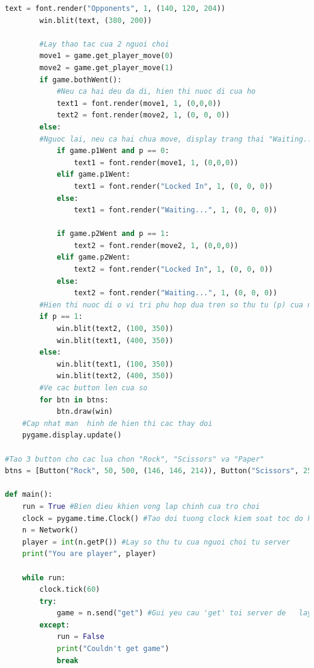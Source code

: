 \documentclass[a4paper]{article}
\begin{document}
\begin{mdframed}[hidealllines=true,backgroundcolor=magenta!10]
\begin{lstlisting}[language=Python]
        text = font.render("Opponents", 1, (140, 120, 204))
        win.blit(text, (380, 200))

        #Lay thao tac cua 2 nguoi choi
        move1 = game.get_player_move(0)
        move2 = game.get_player_move(1)
        if game.bothWent():
            #Neu ca hai deu da di, hien thi nuoc di cua ho
            text1 = font.render(move1, 1, (0,0,0))
            text2 = font.render(move2, 1, (0, 0, 0))
        else:
        #Nguoc lai, neu ca hai chua move, display trang thai "Waiting..." hoac "Locked In" tuy thuoc vao tinh trang cua nguoi choi
            if game.p1Went and p == 0:
                text1 = font.render(move1, 1, (0,0,0))
            elif game.p1Went:
                text1 = font.render("Locked In", 1, (0, 0, 0))
            else:
                text1 = font.render("Waiting...", 1, (0, 0, 0))

            if game.p2Went and p == 1:
                text2 = font.render(move2, 1, (0,0,0))
            elif game.p2Went:
                text2 = font.render("Locked In", 1, (0, 0, 0))
            else:
                text2 = font.render("Waiting...", 1, (0, 0, 0))
        #Hien thi nuoc di o vi tri phu hop dua tren so thu tu (p) cua nguoi choi
        if p == 1:
            win.blit(text2, (100, 350))
            win.blit(text1, (400, 350))
        else:
            win.blit(text1, (100, 350))
            win.blit(text2, (400, 350))
        #Ve cac button len cua so
        for btn in btns:
            btn.draw(win)
    #Cap nhat man  hinh de hien thi cac thay doi
    pygame.display.update()

#Tao 3 button cho cac lua chon "Rock", "Scissors" va "Paper"
btns = [Button("Rock", 50, 500, (146, 146, 214)), Button("Scissors", 250, 500, (146, 146, 214)), Button("Paper", 450, 500, (146, 146, 214))]

def main():
    run = True #Bien dieu khien vong lap chinh cua tro choi
    clock = pygame.time.Clock() #Tao doi tuong clock kiem soat toc do khung hinh cua Pygame
    n = Network()
    player = int(n.getP()) #Lay so thu tu cua nguoi choi tu server
    print("You are player", player)

    while run:
        clock.tick(60)
        try:
            game = n.send("get") #Gui yeu cau 'get' toi server de   lay thong tin ve trang thai tro choi
        except:
            run = False
            print("Couldn't get game")
            break


\end{lstlisting}
\end{mdframed}
\end{document}
